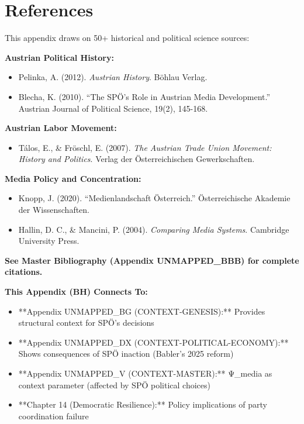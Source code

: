 {%

\section*{References}

This appendix draws on 50+ historical and political science sources:

\textbf{Austrian Political History:}
\begin{itemize}[nosep]
\item Pelinka, A. (2012). \textit{Austrian History}. Böhlau Verlag.
\item Blecha, K. (2010). ``The SPÖ's Role in Austrian Media Development.'' Austrian Journal of Political Science, 19(2), 145-168.
\end{itemize}

\textbf{Austrian Labor Movement:}
\begin{itemize}[nosep]
\item Tálos, E., \& Fröschl, E. (2007). \textit{The Austrian Trade Union Movement: History and Politics}. Verlag der Österreichischen Gewerkschaften.
\end{itemize}

\textbf{Media Policy and Concentration:}
\begin{itemize}[nosep]
\item Knopp, J. (2020). ``Medienlandschaft Österreich.'' Österreichische Akademie der Wissenschaften.
\item Hallin, D. C., \& Mancini, P. (2004). \textit{Comparing Media Systems}. Cambridge University Press.
\end{itemize}

\textbf{See Master Bibliography (Appendix UNMAPPED_BBB) for complete citations.}

\nocite{bcm_master}


\begin{tcolorbox}[colback=orange!5!white, colframe=orange!75!black,
    title=Cross-Reference Links]

\textbf{This Appendix (BH) Connects To:}

\begin{itemize}[nosep]
\item **Appendix UNMAPPED_BG (CONTEXT-GENESIS):** Provides structural context for SPÖ's decisions
\item **Appendix UNMAPPED_DX (CONTEXT-POLITICAL-ECONOMY):** Shows consequences of SPÖ inaction (Babler's 2025 reform)
\item **Appendix UNMAPPED_V (CONTEXT-MASTER):** Ψ_media as context parameter (affected by SPÖ political choices)
\item **Chapter 14 (Democratic Resilience):** Policy implications of party coordination failure
\end{itemize}


\end{tcolorbox}}
